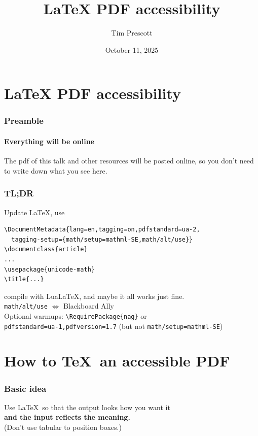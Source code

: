 \documentclass{ltx-talk}
\title{\texorpdfstring{\LaTeX}{LaTeX} PDF accessibility}
\author{Tim Prescott}
\institute[UND]{University of North Dakota}
\date{October 11, 2025}
\begin{document}
\section{\texorpdfstring{\LaTeX}{LaTeX} PDF accessibility}

\begin{frame}
\maketitle
\end{frame}

\begin{frame}
\frametitle{Preamble}
\framesubtitle{Everything will be online}
The pdf of this talk and other resources will be posted online, so you don't need to write down what you see here.
\end{frame}


\begin{frame*}
\frametitle{TL;DR}
Update \LaTeX, use
\begin{verbatim}
\DocumentMetadata{lang=en,tagging=on,pdfstandard=ua-2,
  tagging-setup={math/setup=mathml-SE,math/alt/use}}
\documentclass{article}
...
\usepackage{unicode-math}
\title{...}
\end{verbatim}
compile with Lua\LaTeX, and maybe it all works just fine.\\
\texttt{math/alt/use} $\Leftrightarrow$ Blackboard Ally\\\bigskip
Optional warmups: \verb|\RequirePackage{nag}| or\\
\qquad\texttt{pdfstandard=ua-1,pdfversion=1.7} (but not \texttt{math/setup=mathml-SE})
\end{frame*}

\section{How to \TeX\ an accessible PDF}

\begin{frame}
\frametitle{Basic idea}
Use \LaTeX\ so that the output looks how you want it\\
\textbf{and the input reflects the meaning.}\\
(Don't use tabular to position boxes.)
\end{frame}
\end{document}

